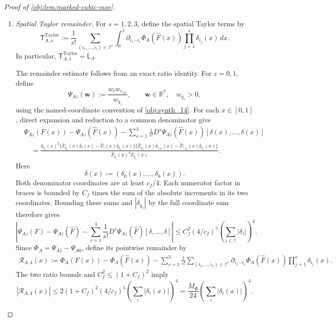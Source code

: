 \begin{proof}[Proof of \cref{obj:lem:marked-cubic-mse}]
\begin{enumerate}
\item \textit{Spatial Taylor remainder.}
For \(s=1,2,3\), define the spatial Taylor terms by
\[
\mathsf T^{\mathrm{Taylor}}_{A,s}
:=
\frac1{s!}
\sum_{(i_1,\ldots,i_s)\in\mathcal I^s}
\int_0^1
\partial_{i_1\cdots i_s}\Phi_A(\widehat F(x))
\prod_{j=1}^s\delta_{i_j}(x)\,dx.
\]
In particular,
\(\mathsf T^{\mathrm{Taylor}}_{A,1}
=\overline{\mathsf L}_A\).

The remainder estimate follows from an exact ratio identity. For \(z=0,1\), define
\[
\Psi_{Az}(\mathbf w)
:=\frac{w_t w_{r_{Az}}}{w_{q_z}},
\qquad
\mathbf w\in\mathbb R^7,\quad w_{q_z}>0,
\]
using the named-coordinate convention of \cref{obj:synth_14}. For each \(x\in[0,1]\), direct expansion and reduction to a common denominator give
\[
\begin{aligned}
&\Psi_{Az}(F(x))-\Psi_{Az}(\widehat F(x))
-\sum_{s=1}^3\frac1{s!}
D^s\Psi_{Az}(\widehat F(x))
[\delta(x),\ldots,\delta(x)]\\
&\quad=
\frac{
\delta_{q_z}(x)^2
\{\widehat F_{q_z}(x)\delta_t(x)
-\widehat F_t(x)\delta_{q_z}(x)\}
\{\widehat F_{q_z}(x)\delta_{r_{Az}}(x)
-\widehat F_{r_{Az}}(x)\delta_{q_z}(x)\}
}{
\widehat F_{q_z}(x)^4 F_{q_z}(x)
}.
\end{aligned}
\]
Here
\[
\delta(x):=(\delta_0(x),\ldots,\delta_6(x)).
\]
Both denominator coordinates are at least \(c_f/4\). Each numerator factor in braces is bounded by \(C_f\) times the sum of the absolute increments in its two coordinates. Bounding these sums and \(|\delta_{q_z}|\) by the full coordinate sum therefore gives
\[
\left|
\Psi_{Az}(F)-\Psi_{Az}(\widehat F)
-\sum_{s=1}^3\frac1{s!}
D^s\Psi_{Az}(\widehat F)[\delta,\ldots,\delta]
\right|
\le C_f^2(4/c_f)^5
\left(\sum_{i\in\mathcal I}|\delta_i|\right)^4.
\]
Since \(\Phi_A=\Psi_{A1}-\Psi_{A0}\), define its pointwise remainder by
\[
\begin{aligned}
\mathcal R_{A,4}(x)
:=\Phi_A(F(x))-\Phi_A(\widehat F(x))
-\sum_{s=1}^3\frac1{s!}
\sum_{(i_1,\ldots,i_s)\in\mathcal I^s}
\partial_{i_1\cdots i_s}\Phi_A(\widehat F(x))
\prod_{j=1}^s\delta_{i_j}(x).
\end{aligned}
\]
The two ratio bounds and \(C_f^2\le(1+C_f)^2\) imply
\[
|\mathcal R_{A,4}(x)|
\le2(1+C_f)^2(4/c_f)^5
\left(\sum_i|\delta_i(x)|\right)^4
=
\frac{M_\Phi}{24}
\left(\sum_i|\delta_i(x)|\right)^4.
\]


\end{enumerate}
\end{proof}

